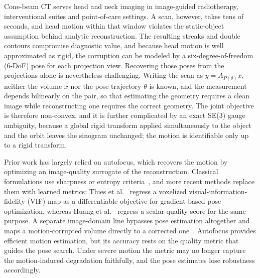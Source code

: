 \documentclass[11pt]{article}
\begin{document}
Cone-beam CT serves head and neck imaging in image-guided radiotherapy, interventional
suites and point-of-care settings. A scan, however, takes tens of seconds, and head motion
within that window violates the static-object assumption behind analytic reconstruction.
The resulting streaks and double contours compromise diagnostic value, and because head
motion is well approximated as rigid, the corruption can be modeled by a
six-degree-of-freedom (6-DoF) pose for each projection view. Recovering those poses from
the projections alone is nevertheless challenging. Writing the scan as
$y = A_{P(\theta)}x$, neither the volume $x$ nor the pose trajectory $\theta$ is known, and
the measurement depends bilinearly on the pair, so that estimating the geometry requires a
clean image while reconstructing one requires the correct geometry. The joint objective is
therefore non-convex, and it is further complicated by an exact SE(3) gauge ambiguity,
because a global rigid transform applied simultaneously to the object and the orbit leaves
the sinogram unchanged; the motion is identifiable only up to a rigid transform.

Prior work has largely relied on autofocus, which recovers the motion by optimizing an
image-quality surrogate of the reconstruction. Classical formulations use sharpness or
entropy criteria~\cite{sisniega17}, and more recent methods replace them with learned
metrics: Thies et al.~\cite{thies25} regress a voxelized visual-information-fidelity (VIF)
map as a differentiable objective for gradient-based pose optimization, whereas Huang et
al.~\cite{huang22} regress a scalar quality score for the same purpose. A separate
image-domain line bypasses pose estimation altogether and maps a motion-corrupted volume
directly to a corrected one~\cite{ko21}. Autofocus provides efficient motion estimation,
but its accuracy rests on the quality metric that guides the pose search. Under severe
motion the metric may no longer capture the motion-induced degradation faithfully, and the
pose estimates lose robustness accordingly.
\end{document}
